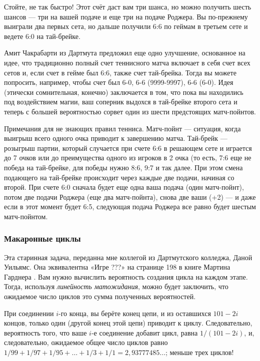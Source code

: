 Стойте, не так быстро!
Этот счёт даст вам три шанса, но можно получить шесть шансов --- три на вашей подаче и еще три на подаче Роджера.
Вы по-прежнему выиграли два первых сета, но дальше получили 6:6 по геймам в третьем сете и ведете 6:0 на тай-брейке.

Амит Чакрабарти из Дартмута предложил еще одно улучшение, основанное на идее, что традиционно полный счет теннисного матча включает в себя счет всех сетов и, если счет в гейме был 6:6, также
счет тай-брейка.
Тогда вы можете попросить, например, чтобы счет был 6-0, 6-6 (9999-9997), 6-6 (6-0).
Идея (этически сомнительная, конечно) заключается в том, что пока вы находились под воздействием магии, ваш соперник выдохся в тай-брейке второго сета и теперь с большей вероятностью сорвет один из шести предстоящих матч-пойнтов.

\begin{addedbytheeditors}
Примечания для не знающих правил тенниса.
Матч-пойнт --- ситуация, когда выигрыш всего одного очка приводит к завершению матча.
Тай-брейк --- розыгрыш партии, который
случается при счете 6:6 в решающем сете и играется до 7 очков или до
преимущества
одного из игроков в 2 очка (то есть, 7:6 еще не победа на тай-брейке, для победы нужно 8:6, 9:7 и так далее. При этом смена подающего на тай-брейке происходит через каждые две подачи, начиная со второй.
При счете 6:0 сначала будет еще одна ваша подача (один матч-пойнт), потом две подачи Роджера (еще два матч-пойнта), снова две ваши (+2) --- и даже если в этот момент будет 6:5, следующая подача Роджера все равно будет
шестым матч-пойнтом.
\end{addedbytheeditors}

\subsubsection*{Макаронные циклы}

Эта старинная задача, переданна мне коллегой из Дартмутского колледжа, Даной Уильямс.
Она эквивалентна «Игре ???» на странице 198 в книге Мартина Гарднера \cite{gardner1971}.
Вам нужно вычислить вероятность создания цикла на каждом этапе.
Тогда, используя \emph{линейность матожидания}, можно будет заключить, что ожидаемое число циклов это сумма полученных вероятностей.

При соединении $i$-го конца, вы берёте конец цепи, и из оставшихся $101 - 2i$ концов, только один (другой конец этой цепи) приводит к циклу.
Следовательно, вероятность того, что ваше $i$-е соединение добавит цикл, равна $1/(101 - 2i)$, и, следовательно, ожидаемое общее число циклов равно $1/99 + 1/97 + 1/95 +\dots + 1/3 + 1/1 = 2{,}93777485\dots$; меньше трех циклов!

